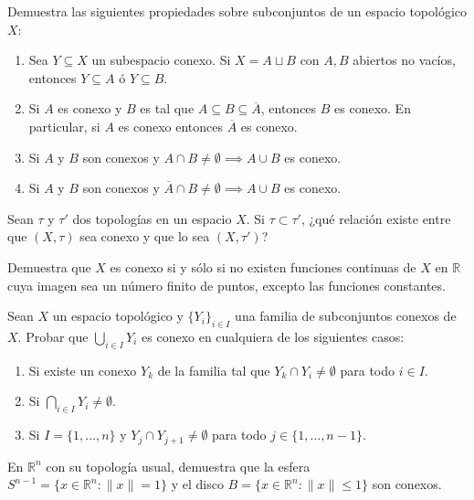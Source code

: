 \begin{ejer}[132]
Demuestra las siguientes propiedades sobre subconjuntos de un espacio topológico $X$:
\begin{enumerate}
    \item[a)] Sea $Y \subseteq X$ un subespacio conexo. Si $X = A \sqcup B$ con $A, B$ abiertos no vacíos, entonces $Y \subseteq A$ ó $Y \subseteq B$.
    \item[b)] Si $A$ es conexo y $B$ es tal que $A \subseteq B \subseteq \overline{A}$, entonces $B$ es conexo. En particular, si $A$ es conexo entonces $\overline{A}$ es conexo.
    \item[c)] Si $A$ y $B$ son conexos y $A \cap B \neq \emptyset \implies A \cup B$ es conexo.
    \item[d)] Si $A$ y $B$ son conexos y $\overline{A} \cap B \neq \emptyset \implies A \cup B$ es conexo.
\end{enumerate}
\end{ejer}

\begin{ejer}[133]
Sean $\tau$ y $\tau'$ dos topologías en un espacio $X$. Si $\tau \subset \tau'$, ¿qué relación existe entre que $(X, \tau)$ sea conexo y que lo sea $(X, \tau')$?
\end{ejer}

\begin{ejer}[134]
Demuestra que $X$ es conexo si y sólo si no existen funciones continuas de $X$ en $\mathbb{R}$ cuya imagen sea un número finito de puntos, excepto las funciones constantes.
\end{ejer}

\begin{ejer}[135]
Sean $X$ un espacio topológico y $\{Y_i\}_{i \in I}$ una familia de subconjuntos conexos de $X$. Probar que $\bigcup_{i \in I} Y_i$ es conexo en cualquiera de los siguientes casos:
\begin{enumerate}
    \item[a)] Si existe un conexo $Y_k$ de la familia tal que $Y_k \cap Y_i \neq \emptyset$ para todo $i \in I$.
    \item[b)] Si $\bigcap_{i \in I} Y_i \neq \emptyset$.
    \item[c)] Si $I = \{1, \dots, n\}$ y $Y_j \cap Y_{j+1} \neq \emptyset$ para todo $j \in \{1, \dots, n-1\}$.
\end{enumerate}
\end{ejer}

\begin{ejer}[136]
En $\mathbb{R}^n$ con su topología usual, demuestra que la esfera $S^{n-1} = \{x \in \mathbb{R}^n : \|x\| = 1\}$ y el disco $B = \{x \in \mathbb{R}^n : \|x\| \le 1\}$ son conexos.
\end{ejer}

